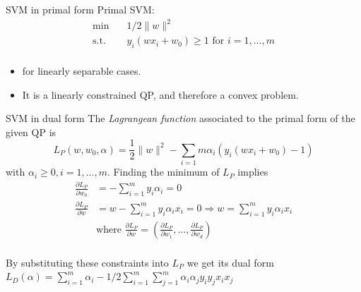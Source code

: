 \documentclass[notes]{beamer}
\begin{document}
\begin{frame}
	{SVM in primal form}
	Primal SVM:
	\begin{equation*}
		\begin{aligned}
			\min \quad          & 1/2 \|w\|^2                               \\
			\mathrm{s.t.} \quad & y_i(wx_i+w_0)\ge 1 \text{ for } i=1,...,m \\
		\end{aligned}
	\end{equation*}
	\begin{itemize}
		\item for linearly separable cases.
		\item It is a linearly constrained QP, and therefore a convex problem.
	\end{itemize}
\end{frame}
\begin{frame}
	{SVM in dual form}
	The \emph{Lagrangean function} associated to the primal form of the given QP is \[
		L_P(w,w_0,\alpha)=\frac{1}{2}\|w\|^2 - \sum_{i=1}{m} \alpha_i(y_i(wx_i+w_0)-1)
	\]
	with $\alpha_i\ge 0, i =1,...,m$. Finding the minimum of $L_P$ implies
	\begin{equation*}
		\begin{aligned}
			\frac{\partial L_P}{\partial w_0} & =-\sum_{i=1}^{m}y_i\alpha_i=0                                                                                             \\
			\frac{\partial L_P}{\partial w}   & =w-\sum_{i=1}^{m}y_i \alpha_i x_i=0 \Rightarrow w=\sum_{i=1}^{m}y_i \alpha_i x_i                                          \\
			\quad                             & \text{where } \frac{\partial L_P}{\partial w}=(\frac{\partial L_P}{\partial w_1}, ..., \frac{\partial L_P}{\partial w_d}) \\
		\end{aligned}
	\end{equation*}

	By substituting these constraints into $L_P$ we get its dual form
	$L_D(\alpha) = \sum_{i=1}^{m} \alpha_i - 1/2 \sum_{i=1}^{m} \sum_{j=1}^{m} \alpha_i \alpha_j y_i y_j x_i x_j$

\end{frame}
\end{document}
